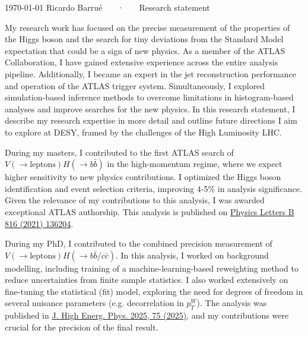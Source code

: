 \documentclass[11pt, a4paper]{awesome-cv}
\begin{document}
\makecvheader[R]

\makecvfooter
  {\today}
  {Ricardo Barrué ~~~·~~~ Research statement}
  {}

\makelettertitle

\begin{cvletter}

  My research work has focused on the precise measurement of the properties of the Higgs boson and the search for tiny deviations from the Standard Model expectation that could be a sign of new physics. As a member of the ATLAS Collaboration, I have gained extensive experience across the entire analysis pipeline. Additionally, I became an expert in the jet reconstruction performance and operation of the ATLAS trigger system. Simultaneously, I explored simulation-based inference methods to overcome limitations in histogram-based analyses and improve searches for the new physics. In this research statement, I describe my research expertise in more detail and outline future directions I aim to explore at DESY, framed by the challenges of the High Luminosity LHC.

  
  During my masters, I contributed to the first ATLAS search of $V(\to \textrm{leptons})H(\to b\bar{b})$ in the high-momentum regime, where we expect higher sensitivity to new physics contributions. I optimized the Higgs boson identification and event selection criteria, improving 4-5\% in analysis significance. Given the relevance of my contributions to this analysis, I was awarded exceptional ATLAS authorship. This analysis is published on \href{https://doi.org/10.1016/j.physletb.2021.136204}{Physics Letters B 816 (2021) 136204}.
  
  During my PhD, I contributed to the combined precision measurement of $V(\to \textrm{leptons})H(\to b\bar{b}/c\bar{c})$. In this analysis, I worked on background modelling, including training of a machine-learning-based reweighting method to reduce uncertainties from finite sample statistics. I also worked extensively on fine-tuning the statistical (fit) model, exploring the need for degrees of freedom in several nuisance parameters (e.g. decorrelation in $p_T^W$). The analysis was published in \href{https://doi.org/10.1007/JHEP04(2025)075}{J. High Energ. Phys. 2025, 75 (2025)}, and my contributions were crucial for the precision of the final result.
  

\end{cvletter}
\end{document}
